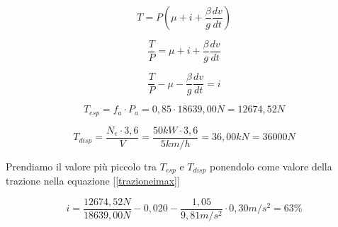 \documentclass[
a4paper,
12pt, 
twoside]{scrbook}
\begin{document}
{{{{    \leavevmode\newline
    
    \begin{equation}
    	T=P(\mu+i+\frac{\beta}{g}\frac{dv}{dt})
    \end{equation}
    
    \begin{equation}
    	\frac{T}{P}=\mu+i+\frac{\beta}{g}\frac{dv}{dt}
    \end{equation}
    
    \begin{equation}\label{trazioneimax}
    	\frac{T}{P}-\mu-\frac{\beta}{g}\frac{dv}{dt}=i
    \end{equation}
    	
    {
    	\centering
    
    \begin{equation}
    	T_{esp}=f_{a}\cdot P_{a}= 0,85\cdot 18639,00N= 12674,52N
    \end{equation}
    
    \begin{equation}
    	T_{disp}=\frac{N_e\cdot 3,6}{V}=\frac{50kW\cdot 3,6}{5km/h}=36,00kN=36000N
    \end{equation}
    
    \begin{boxF}
    	Prendiamo il valore più piccolo tra $T_{esp}$ e $T_{disp}$ ponendolo come valore della trazione nella equazione [\ref{trazioneimax}]
    \end{boxF}
    	
    \begin{equation}
    	i=\frac{12674,52N}{18639,00N}-0,020-\frac{1,05}{9,81m/s^2}\cdot 0,30m/s^2=63\%
    \end{equation}	
    \leavevmode\newline
    
}}}}}
\end{document}
